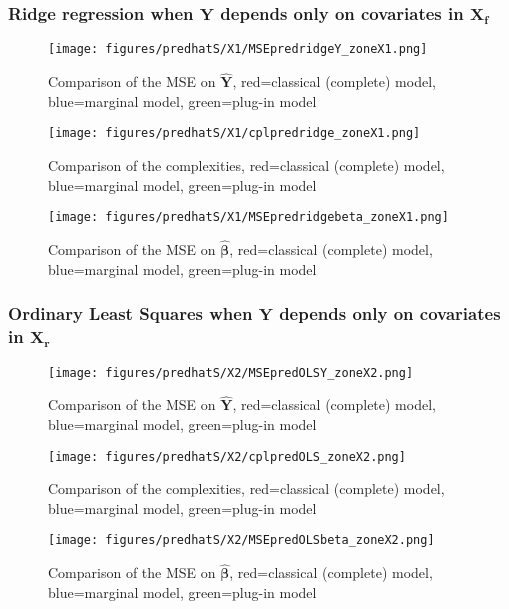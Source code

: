 \documentclass[12pt,a4paper]{report}
\begin{document}
\subsubsection{Ridge regression when $\boldsymbol{Y}$ depends only on covariates in $\boldsymbol{X_f}$}

\begin{figure}[h!]
	\centering
		  \texttt{[image: figures/predhatS/X1/MSEpredridgeY\_zoneX1.png]}
		\caption{Comparison of the MSE on $\hat{\boldsymbol{Y}}$, red=classical (complete) model, blue=marginal model, green=plug-in model}\label{MSEpredridgeY_zoneX1}
	\end{figure}
	\begin{figure}[h!]
	\centering
		  \texttt{[image: figures/predhatS/X1/cplpredridge\_zoneX1.png]}
		\caption{Comparison of the complexities, red=classical (complete) model, blue=marginal model, green=plug-in model}\label{cplpredridge_zoneX1}
	\end{figure}
	\begin{figure}[h!]
	\centering
		  \texttt{[image: figures/predhatS/X1/MSEpredridgebeta\_zoneX1.png]}
		\caption{Comparison of the MSE on $\hat{\boldsymbol{\beta}}$, red=classical (complete) model, blue=marginal model, green=plug-in model}\label{MSEpredridgebeta_zoneX1}
	\end{figure}
	\FloatBarrier


\clearpage


\FloatBarrier

\newpage

\subsubsection{Ordinary Least Squares when $\boldsymbol{Y}$ depends only on covariates in $\boldsymbol{X_r}$}

	\begin{figure}[h!]
	\centering
		  \texttt{[image: figures/predhatS/X2/MSEpredOLSY\_zoneX2.png]}
		\caption{Comparison of the MSE on $\hat{\boldsymbol{Y}}$, red=classical (complete) model, blue=marginal model, green=plug-in model}\label{MSEpredOLSY_zoneX2}
	\end{figure}
	\begin{figure}[h!]
	\centering
		  \texttt{[image: figures/predhatS/X2/cplpredOLS\_zoneX2.png]}
		\caption{Comparison of the complexities, red=classical (complete) model, blue=marginal model, green=plug-in model}\label{cplpredOLS_zoneX2}
	\end{figure}
	\begin{figure}[h!]
	\centering
		  \texttt{[image: figures/predhatS/X2/MSEpredOLSbeta\_zoneX2.png]}
		\caption{Comparison of the MSE on $\hat{\boldsymbol{\beta}}$, red=classical (complete) model, blue=marginal model, green=plug-in model}\label{MSEpredOLSbeta_zoneX2}
	\end{figure}
	\FloatBarrier
\newpage
\end{document}
